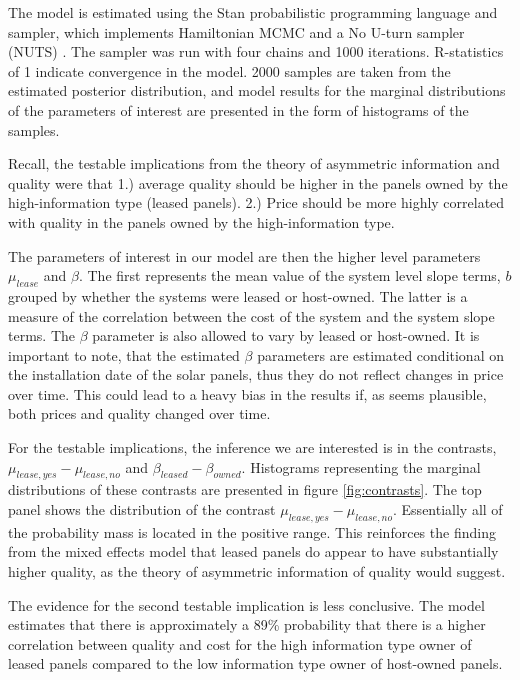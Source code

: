 \documentclass[12pt]{article}
\begin{document}
The model is estimated using the Stan probabilistic programming language and sampler, which implements Hamiltonian MCMC and a No U-turn sampler (NUTS) \citep{stan_development_team_stan_2014}. The sampler was run with four chains and 1000 iterations. R-statistics of 1 indicate convergence in the model. 2000 samples are taken from the estimated posterior distribution, and model results for the marginal distributions of the parameters of interest are presented in the form of histograms of the samples.

Recall, the testable implications from the theory of asymmetric information and quality were that 1.) average quality should be higher in the panels owned by the high-information type (leased panels). 2.) Price should be more highly correlated with quality in the panels owned by the high-information type.

The parameters of interest in our model are then the higher level parameters $\mu_{lease}$ and $\beta$. The first represents the mean value of the system level slope terms, $b$ grouped by whether the systems were leased or host-owned. The latter is a measure of the correlation between the cost of the system and the system slope terms. The $\beta$ parameter is also allowed to vary by leased or host-owned. It is important to note, that the estimated $\beta$ parameters are estimated conditional on the installation date of the solar panels, thus they do not reflect changes in price over time. This could lead to a heavy bias in the results if, as seems plausible, both prices and quality changed over time.

For the testable implications, the inference we are interested is in the contrasts, $\mu_{lease, yes} - \mu_{lease, no}$ and $\beta_{leased}- \beta_{owned}$. Histograms representing the marginal distributions of these contrasts are presented in figure \ref{fig:contrasts}. The top panel shows the distribution of the contrast $\mu_{lease, yes} - \mu_{lease, no}$. Essentially all of the probability mass is located in the positive range. This reinforces the finding from the mixed effects model that leased panels do appear to have substantially higher quality, as the theory of asymmetric information of quality would suggest.

The evidence for the second testable implication is less conclusive. The model estimates that there is approximately a 89\% probability that there is a higher correlation between quality and cost for the high information type owner of leased panels compared to the low information type owner of host-owned panels.
\end{document}
